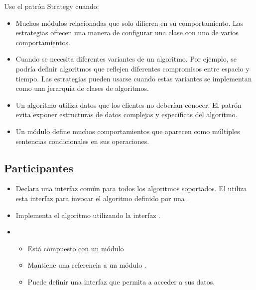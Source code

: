 Use el patrón Strategy cuando:

\begin{itemize}

\item Muchos módulos relacionadas que solo difieren en su comportamiento. Las estrategias ofrecen una manera de configurar una clase con uno de varios comportamientos.

\item Cuando se necesita diferentes variantes de un algoritmo. Por ejemplo, se podría definir algoritmos que reflejen diferentes compromisos entre espacio y tiempo. Las estrategias pueden usarse cuando estas variantes se implementan como una jerarquía de clases de algoritmos.

\item Un algoritmo utiliza datos que los clientes no deberían conocer. El patrón evita exponer estructuras de datos complejas y específicas del algoritmo.

\item Un módulo define muchos comportamientos que aparecen como múltiples sentencias condicionales en sus operaciones.

\end{itemize}


\subsection*{Participantes}


\begin{itemize}
\item \Estrategia Declara una interfaz común para todos los algoritmos soportados. El \Contexto utiliza esta interfaz para invocar el algoritmo definido por una \EstrategiaConcreta.

\item \EstrategiaConcreta Implementa el algoritmo utilizando la interfaz \Estrategia.

\item  \Contexto \begin{itemize}
		\item Está compuesto con un módulo \EstrategiaConcreta
		\item Mantiene una referencia a un módulo \Estrategia.
		\item Puede definir una interfaz que permita a \Estrategia acceder a sus datos.

		\end{itemize}


\end{itemize}


